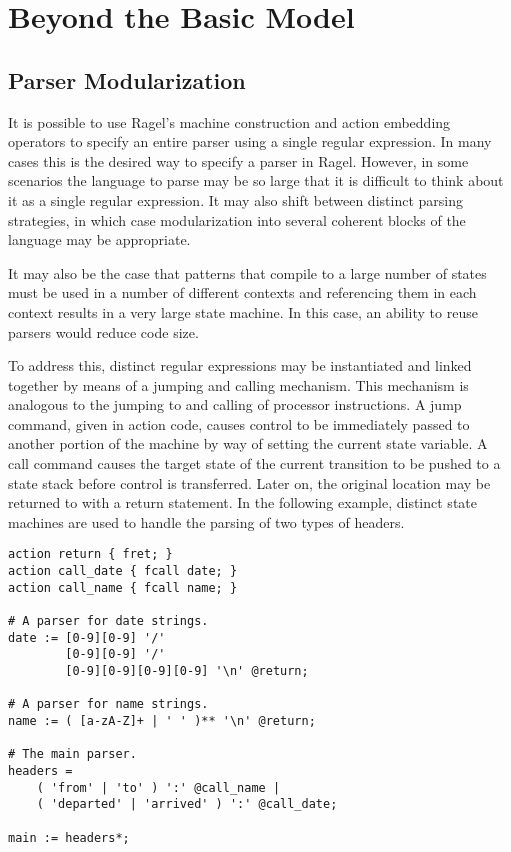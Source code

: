 \documentclass[letterpaper,11pt,oneside]{book}
\newcommand{\verbspace}{\vspace{10pt}}
\newenvironment{inline_code}{\def\baselinestretch{1}\vspace{12pt}\small}{}
\begin{document}
\chapter{Beyond the Basic Model}

\section{Parser Modularization}
\label{modularization}

It is possible to use Ragel's machine construction and action embedding
operators to specify an entire parser using a single regular expression. In
many cases this is the desired way to specify a parser in Ragel. However, in
some scenarios the language to parse may be so large that it is difficult to
think about it as a single regular expression. It may also shift between distinct
parsing strategies, in which case modularization into several coherent blocks
of the language may be appropriate.

It may also be the case that patterns that compile to a large number of states
must be used in a number of different contexts and referencing them in each
context results in a very large state machine. In this case, an ability to reuse
parsers would reduce code size.

To address this, distinct regular expressions may be instantiated and linked
together by means of a jumping and calling mechanism. This mechanism is
analogous to the jumping to and calling of processor instructions. A jump
command, given in action code, causes control to be immediately passed to
another portion of the machine by way of setting the current state variable. A
call command causes the target state of the current transition to be pushed to
a state stack before control is transferred.  Later on, the original location
may be returned to with a return statement. In the following example, distinct
state machines are used to handle the parsing of two types of headers.

\begin{inline_code}
\begin{verbatim}
action return { fret; }
action call_date { fcall date; }
action call_name { fcall name; }

# A parser for date strings.
date := [0-9][0-9] '/' 
        [0-9][0-9] '/' 
        [0-9][0-9][0-9][0-9] '\n' @return;

# A parser for name strings.
name := ( [a-zA-Z]+ | ' ' )** '\n' @return;

# The main parser.
headers = 
    ( 'from' | 'to' ) ':' @call_name | 
    ( 'departed' | 'arrived' ) ':' @call_date;

main := headers*;
\end{verbatim}
\end{inline_code}
\verbspace
\end{document}
